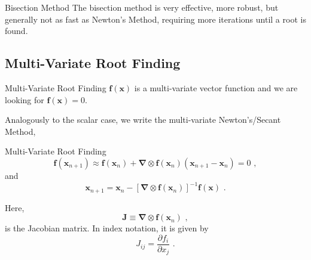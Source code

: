 \documentclass[11pt]{beamer}
\begin{document}
\begin{frame}[fragile]{Bisection Method}
The bisection method is very effective, more robust, but generally not
as fast as Newton's Method, requiring more iterations until a root
is found.
\end{frame}

\subsection{Multi-Variate Root Finding}
\begin{frame}[fragile]{Multi-Variate Root Finding}
$\mathbf{f}(\mathbf{x})$ is a multi-variate vector function and we are
looking for $\mathbf{f}(\mathbf{x}) = 0$. \\
\bigskip

Analogously to the scalar case, we
write the multi-variate Newton's/Secant Method,
\end{frame}

\begin{frame}[fragile]{Multi-Variate Root Finding}
\begin{equation}
\mathbf{f}(\mathbf{x}_{n+1}) \approx \mathbf{f}(\mathbf{x}_n) 
+  \mathbf{\nabla}\otimes\mathbf{f}(\mathbf{x}_n) (\mathbf{x}_{n+1} - \mathbf{x}_n) = 0\,\,,
\end{equation}
and
\begin{equation}
\mathbf{x}_{n+1} = \mathbf{x}_n - \left[ \mathbf{\nabla}\otimes\mathbf{f}(\mathbf{x}_n) \right]^{-1} \mathbf{f}(\mathbf{x})\,\,.
\label{eq:mvnr}
\end{equation}

Here,
\begin{equation}
\mathbf{J} \equiv  \mathbf{\nabla}\otimes \mathbf{f}(\mathbf{x}_n)\,\,,
\end{equation}
is the Jacobian matrix. In index notation, it is given by
\begin{equation}
J_{ij} = \frac{\partial f_i}{\partial x_j}\,\,.
\end{equation}
\end{frame}
\end{document}
